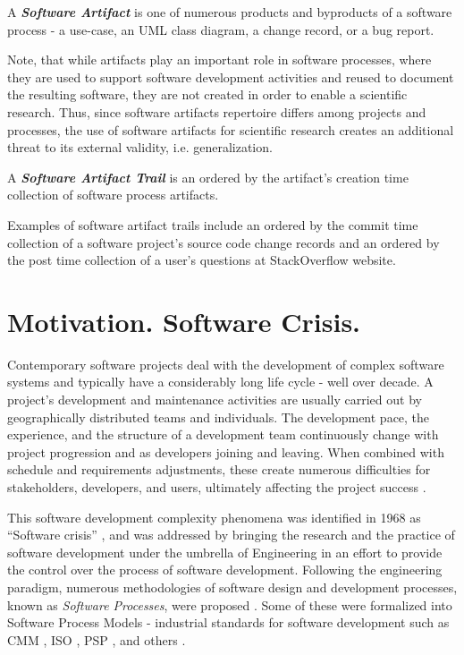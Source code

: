 \begin{defn}\label{def_artifact}
A \textbf{\textit{Software Artifact}} is one of numerous products and byproducts of a software process - 
a use-case, an UML class diagram, a change record, or a bug report. 
\end{defn}
Note, that while artifacts play an important role in software processes, where they are used to support 
software development activities and reused to document the resulting software, they are not created 
in order to enable a scientific research. Thus, since software artifacts repertoire differs among projects 
and processes, the use of software artifacts for scientific research creates an additional threat to its 
external validity, i.e. generalization.

\begin{defn}\label{def_artifact_trail}
A \textbf{\textit{Software Artifact Trail}} is an ordered by the artifact's creation time collection of 
software process artifacts.
\end{defn}
Examples of software artifact trails include an ordered by the commit time collection of a software project's 
source code change records and an ordered by the post time collection of a user's questions at StackOverflow 
website.

\newpage
%
%
\section{Motivation. Software Crisis.}\label{section_background}

Contemporary software projects deal with the development of complex software systems and typically have 
a considerably long life cycle - well over decade.
A project's development and maintenance activities are usually carried out by geographically 
distributed teams and individuals. The development pace, the experience, and the structure of a 
development team continuously change with project progression and as developers joining and leaving. 
When combined with schedule and requirements adjustments, these create numerous difficulties 
for stakeholders, developers, and users, ultimately affecting the project success \cite{citeulike:2207657}. 

This software development complexity phenomena was identified in 1968 as ``Software crisis'' 
\cite{naur_crisis_68}, and was addressed by bringing the research and the practice of software 
development under the umbrella of Engineering in an effort to provide the control over the process 
of software development. 
Following the engineering paradigm, numerous methodologies of software design and development 
processes, known as \textit{Software Processes}, were proposed \cite{citeulike:10002165}.
Some of these were formalized into Software Process Models - industrial standards for software development 
such as CMM \cite{citeulike:9962021}, ISO \cite{iso-standard}, 
PSP \cite{citeulike:8347315}, and others \cite{citeulike:5043104}. 

